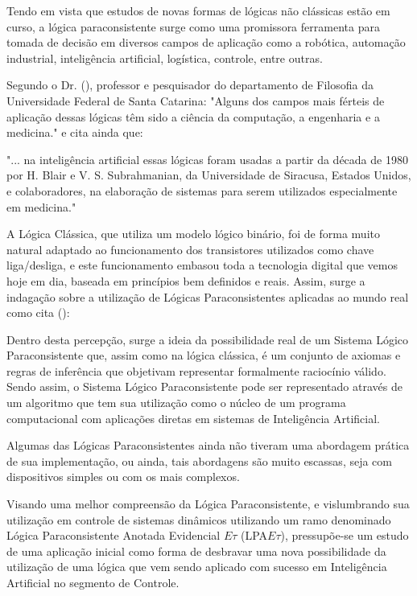 
Tendo em vista que estudos de novas formas de lógicas não clássicas estão em curso, a lógica paraconsistente surge como uma promissora ferramenta para tomada de decisão em diversos campos de aplicação como a robótica, automação industrial, inteligência artificial, logística, controle, entre outras\cite{JoaoInacio}.
 
Segundo o Dr. \citeauthor{DecioKrause}(\citeyear{DecioKrause}), professor e pesquisador do departamento de Filosofia da Universidade Federal de Santa Catarina: "Alguns dos campos mais férteis de aplicação dessas lógicas têm sido a ciência da computação, a engenharia e a medicina." e cita ainda que:
\begin{citacao}{
 "... na inteligência artificial essas lógicas foram usadas a partir da década de 1980 por H. Blair e V. S. Subrahmanian, da Universidade de Siracusa, Estados Unidos, e colaboradores, na elaboração de sistemas para serem utilizados especialmente em medicina." 
}
\end{citacao}

A Lógica Clássica, que utiliza um modelo lógico binário, foi de forma muito natural adaptado ao funcionamento dos transistores utilizados como chave liga/desliga, e este funcionamento embasou toda a tecnologia digital que vemos hoje em dia, baseada em princípios bem definidos e reais. Assim, surge a indagação sobre a utilização de Lógicas Paraconsistentes aplicadas ao mundo real como cita \citeauthor{JISF2011}(\citeyear{JISF2011}):

\begin{citacao}{
Dentro desta percepção, surge a ideia da possibilidade real de um Sistema Lógico Paraconsistente que, assim como na lógica clássica, é um conjunto de axiomas e regras de inferência que objetivam representar formalmente raciocínio válido. Sendo assim, o Sistema Lógico Paraconsistente pode ser representado através de um algoritmo que tem sua utilização como o núcleo de um programa computacional com aplicações diretas em sistemas de Inteligência Artificial.
}
\end{citacao}



Algumas das Lógicas Paraconsistentes ainda não tiveram  uma abordagem prática de sua implementação, ou ainda, tais abordagens são muito escassas, seja com dispositivos simples ou com os mais complexos. 

Visando uma melhor compreensão da Lógica Paraconsistente, 
e vislumbrando sua utilização em controle de sistemas dinâmicos 
utilizando um ramo denominado 
Lógica Paraconsistente Anotada Evidencial $E\tau$ (LPA$E\tau$), 
pressupõe-se um estudo de uma aplicação inicial 
como forma de desbravar uma nova possibilidade da utilização 
de uma lógica que vem sendo aplicado com sucesso em 
Inteligência Artificial no segmento de Controle.




